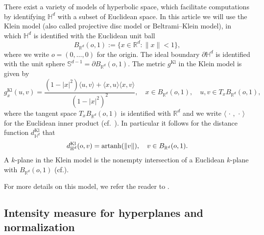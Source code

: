 \documentclass[12pt,a4paper]{article}
\theoremstyle{definition}
\renewcommand{\H}{\mathbb{H}}
\newcommand{\R}{\mathbb{R}}
\begin{document}
There exist a variety of models of hyperbolic space, which facilitate computations by identifying $\H^d$ with a subset of Euclidean space.
In this article we will use the Klein model (also called projective disc model or Beltrami--Klein model), in which $\H^d$ is identified with the Euclidean unit ball
\[
B_{\mathbb{R}^d}(o,1):=\{x\in\mathbb{R}^d\colon \|x\|<1\},
\]
where we write $o=(0,\ldots,0)$ for the origin.
The ideal boundary $\partial \mathbb{H}^d$ is identified with the unit sphere $\mathbb{S}^{d-1}=\partial B_{\mathbb{R}^d}(o,1)$.
The metric $g^\text{Kl}$ in the Klein model is given by
\[ g^\text{Kl}_x(u,v) = \frac{(1-|x|^2)\langle u,v \rangle + \langle x,u \rangle \langle x,v\rangle}{(1-|x|^2)^2},\quad x \in B_{\R^d}(o,1),\quad u,v \in T_xB_{\R^d}(o,1),  \]
where the tangent space $T_x B_{\R^d}(o,1)$ is identified with $\R^d$ and we write $\langle \, \cdot\, , \, \cdot \, \rangle$ for the Euclidean inner product (cf.~\cite[Theorem 6.1.5]{Ra19}).
In particular it follows for the distance function $d_{\H^d}^\text{Kl}$ that
\begin{equation}\label{eq:DistanceKlein}
d_{\mathbb{H}^d}^{\rm Kl}(o,v)={\rm artanh}(\|v\|), \quad v \in B_{\R^d}(o,1).
\end{equation}
A $k$-plane in the Klein model is the nonempty intersection of a Euclidean $k$-plane with $B_{\R^d}(o,1)$ (cf.\cite[Theorem 6.1.4]{Ra19}).

For more details on this model, we refer the reader to \cite[Section 6.1]{Ra19}.



\subsection{Intensity measure for hyperplanes and normalization} \label{sec:intensity measure} 
\end{document}
